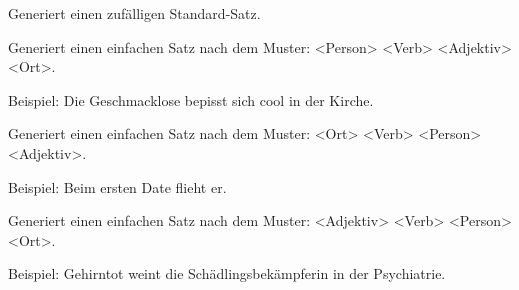\documentclass[a4paper,12pt,oneside]{sphinxmanual}
\begin{document}

\begin{fulllineitems}
\label{module:pyzufall.satz.satz_standard}
Generiert einen zufälligen Standard-Satz.

\end{fulllineitems}


\begin{fulllineitems}
\label{module:pyzufall.satz.satz_standard_1}
Generiert einen einfachen Satz nach dem Muster: \textless{}Person\textgreater{} \textless{}Verb\textgreater{} \textless{}Adjektiv\textgreater{} \textless{}Ort\textgreater{}.

Beispiel: Die Geschmacklose bepisst sich cool in der Kirche.

\end{fulllineitems}


\begin{fulllineitems}
\label{module:pyzufall.satz.satz_standard_2}
Generiert einen einfachen Satz nach dem Muster: \textless{}Ort\textgreater{} \textless{}Verb\textgreater{} \textless{}Person\textgreater{} \textless{}Adjektiv\textgreater{}.

Beispiel: Beim ersten Date flieht er.

\end{fulllineitems}


\begin{fulllineitems}
\label{module:pyzufall.satz.satz_standard_3}
Generiert einen einfachen Satz nach dem Muster: \textless{}Adjektiv\textgreater{} \textless{}Verb\textgreater{} \textless{}Person\textgreater{} \textless{}Ort\textgreater{}.

Beispiel: Gehirntot weint die Schädlingsbekämpferin in der Psychiatrie.

\end{fulllineitems}

\end{document}
